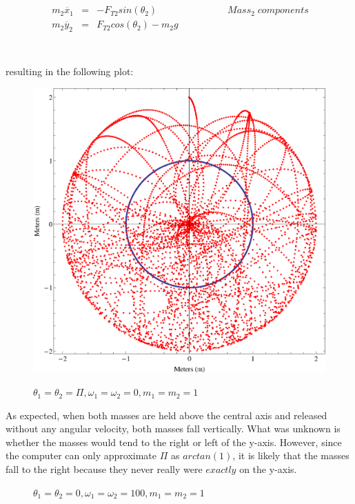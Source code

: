 \documentclass{report}
\begin{document}
\begin{enumerate}
\begin{eqnarray*}
\ \\
\ m_2\ddot{x_1} & = & -F_{T2}sin(\theta_2) \qquad \qquad \qquad \quad \;  Mass_2 \; components\\
\ m_2\ddot{y_2} & = & F_{T2}cos(\theta_2)-m_2g  \\
\end{eqnarray*}
\\
\\resulting in the following plot:
\begin{figure}[H]
\centering \caption{$\theta_1=\theta_2=\Pi, \omega_1=\omega_2=0, m_1=m_2=1$}
\includegraphics[scale=.5]{doublePend.eps}
\label{fatEarth}
\end{figure}
As expected, when both masses are held above the central axis and released without any angular velocity, both masses fall vertically. What was unknown is whether the masses would tend to the right or left of the y-axis. However, since the computer can only approximate $\Pi$ as $arctan(1)$, it is likely that the masses fall to the right because they never really were $exactly$ on the y-axis.
\begin{figure}[H]
\centering \caption{$\displaystyle \theta_1=\theta_2=0, \omega_1=\omega_2=100, m_1=m_2=1$}

\end{figure}
\end{enumerate}
\end{document}
